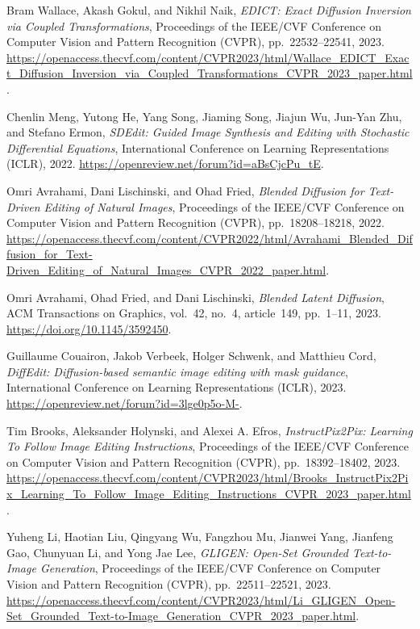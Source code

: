 Bram Wallace, Akash Gokul, and Nikhil Naik,
\textit{EDICT: Exact Diffusion Inversion via Coupled Transformations},
Proceedings of the IEEE/CVF Conference on Computer Vision and Pattern Recognition (CVPR), pp.~22532--22541, 2023.
\url{https://openaccess.thecvf.com/content/CVPR2023/html/Wallace_EDICT_Exact_Diffusion_Inversion_via_Coupled_Transformations_CVPR_2023_paper.html}.

Chenlin Meng, Yutong He, Yang Song, Jiaming Song, Jiajun Wu, Jun-Yan Zhu, and Stefano Ermon,
\textit{SDEdit: Guided Image Synthesis and Editing with Stochastic Differential Equations},
International Conference on Learning Representations (ICLR), 2022.
\url{https://openreview.net/forum?id=aBsCjcPu_tE}.

Omri Avrahami, Dani Lischinski, and Ohad Fried,
\textit{Blended Diffusion for Text-Driven Editing of Natural Images},
Proceedings of the IEEE/CVF Conference on Computer Vision and Pattern Recognition (CVPR), pp.~18208--18218, 2022.
\url{https://openaccess.thecvf.com/content/CVPR2022/html/Avrahami_Blended_Diffusion_for_Text-Driven_Editing_of_Natural_Images_CVPR_2022_paper.html}.

Omri Avrahami, Ohad Fried, and Dani Lischinski,
\textit{Blended Latent Diffusion},
ACM Transactions on Graphics, vol.~42, no.~4, article~149, pp.~1--11, 2023.
\url{https://doi.org/10.1145/3592450}.

Guillaume Couairon, Jakob Verbeek, Holger Schwenk, and Matthieu Cord,
\textit{DiffEdit: Diffusion-based semantic image editing with mask guidance},
International Conference on Learning Representations (ICLR), 2023.
\url{https://openreview.net/forum?id=3lge0p5o-M-}.

Tim Brooks, Aleksander Holynski, and Alexei A. Efros,
\textit{InstructPix2Pix: Learning To Follow Image Editing Instructions},
Proceedings of the IEEE/CVF Conference on Computer Vision and Pattern Recognition (CVPR), pp.~18392--18402, 2023.
\url{https://openaccess.thecvf.com/content/CVPR2023/html/Brooks_InstructPix2Pix_Learning_To_Follow_Image_Editing_Instructions_CVPR_2023_paper.html}.

Yuheng Li, Haotian Liu, Qingyang Wu, Fangzhou Mu, Jianwei Yang, Jianfeng Gao, Chunyuan Li, and Yong Jae Lee,
\textit{GLIGEN: Open-Set Grounded Text-to-Image Generation},
Proceedings of the IEEE/CVF Conference on Computer Vision and Pattern Recognition (CVPR), pp.~22511--22521, 2023.
\url{https://openaccess.thecvf.com/content/CVPR2023/html/Li_GLIGEN_Open-Set_Grounded_Text-to-Image_Generation_CVPR_2023_paper.html}.

